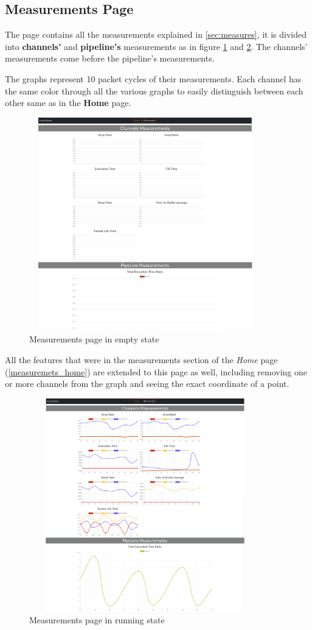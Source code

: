 \subsection{Measurements Page}
The page contains all the measurements explained in \ref{sec:measures}, it is divided into \textbf{channels'} and
\textbf{pipeline's} measurements as in figure \ref{fig:measures_empty} and \ref{fig:measures_running_state}. The
channels' measurements come before the pipeline's measurements.

The graphs represent 10 packet cycles of their measurements. Each channel has the same color through all the
various graphs to easily distinguish between each other same as in the \textbf{Home} page.
\newline
\begin{figure}[H]
	\centering
	\includegraphics[width=0.9\textwidth,height=350px]{images/measures_empty.jpg}
	\caption{Measurements page in empty state}
	\label{fig:measures_empty}
\end{figure}

All the features that were in the measurements section of the \textit{Home} page (\ref{measuremets_home})
are extended to this page as well, including removing one or more channels from the graph and
seeing the exact coordinate of a point.
\begin{figure}[H]
	\centering
	\includegraphics[width=0.9\textwidth,height=350px]{images/measures_running_state.jpg}
	\caption{Measurements page in running state}
	\label{fig:measures_running_state}
\end{figure}
